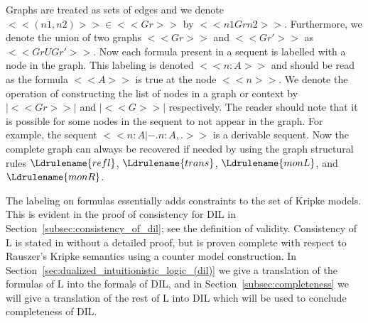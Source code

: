 Graphs are treated as sets of edges and we denote $<<(n1,n2)>> \in
<<Gr>>$ by $<<n1 Gr n2>>$.  Furthermore, we denote the union of two
graphs $<<Gr>>$ and $<<Gr'>>$ as $<<Gr U Gr'>>$. Now each formula
present in a sequent is labelled with a node in the graph.  This
labeling is denoted $<<n : A>>$ and should be read as the formula
$<<A>>$ is true at the node $<<n>>$.  We denote the operation of
constructing the list of nodes in a graph or context by $|<<Gr>>|$
and $|<<G>>|$ respectively. The reader should note that it is possible
for some nodes in the sequent to not appear in the graph.  For
example, the sequent $<<n : A |- . n : A,.>>$ is a derivable sequent.
Now the complete graph can always be recovered if needed by using the
graph structural rules $\Ldrulename{refl}$, $\Ldrulename{trans}$,
$\Ldrulename{monL}$, and $\Ldrulename{monR}$.

The labeling on formulas essentially adds constraints to the set of
Kripke models.  This is evident in the proof of consistency for DIL in
Section~\ref{subsec:consistency_of_dil}; see the definition of
validity. Consistency of L is stated in \cite{Pinto:2009} without a
detailed proof, but is proven complete with respect to Rauszer's
Kripke semantics using a counter model construction.  In
Section~\ref{sec:dualized_intuitionistic_logic_(dil)} we give a
translation of the formulas of L into the formals of DIL, and in
Section~\ref{subsec:completeness} we will give a translation of the
rest of L into DIL which will be used to conclude completeness of DIL.

